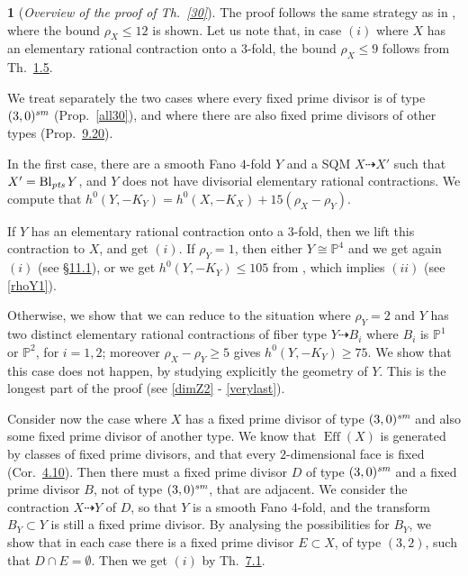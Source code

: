 \documentclass[10pt,a4paper]{amsart}
\theoremstyle{definition}
\newtheorem{prg}[thm]{}
\numberwithin{figure}{section}
\numberwithin{table}{section}
\newcommand{\pr}{\mathbb{P}}
\newcommand{\Eff}{\operatorname{Eff}}
\newcommand{\Bl}{\operatorname{Bl}}
\newcommand{\sm}{\text{\it sm}}
\newcommand{\pts}{\text{\it pts}}
\begin{document}
\begin{prg}[\em Overview of the proof of Th.~\ref{30}]\label{overview30}
The proof follows the same strategy as in \cite{blowup}, where the bound $\rho_X\leq 12$ is shown. Let us note that, in case $(i)$ where $X$ has an elementary rational contraction onto a $3$-fold, the bound $\rho_X\leq 9$ follows from Th.~\href{https://arxiv.org/abs/2508.21207v1}{1.5}.

We treat separately the two cases where every fixed prime divisor is of type $(3,0)^{\sm}$ (Prop.~\ref{all30}), and where there are also fixed prime divisors of other types (Prop.~\href{https://arxiv.org/abs/2508.21207v1}{9.20}).

In the first case, there are a smooth Fano $4$-fold $Y$ and a SQM $X\dasharrow X'$ such that $X'=\Bl_{\pts}Y$, and $Y$ does not have divisorial elementary rational contractions. We compute that $h^0(Y,-K_Y)=h^0(X,-K_X)+15(\rho_X-\rho_Y)$.  

If $Y$ has an elementary rational contraction onto a $3$-fold, then we lift this contraction to $X$, and get $(i)$.
If $\rho_Y=1$, then  either $Y\cong\pr^4$ and we get again $(i)$ (see \S\href{https://arxiv.org/abs/2508.21207v1}{11.1}), or we get $h^0(Y,-K_Y)\leq 105$ from \cite{blowup}, which implies
$(ii)$ (see \ref{rhoY1}).

Otherwise, we show that we can reduce to the situation where
 $\rho_Y=2$ and $Y$ has two distinct elementary rational contractions of fiber type $Y\dasharrow B_i$ where $B_i$ is $\pr^1$ or $\pr^2$, for $i=1,2$; moreover $\rho_X-\rho_Y\geq 5$ gives 
$h^0(Y,-K_Y)\geq 75$.
We show that this case does not happen, by studying explicitly the geometry of $Y$.
 This is the longest part of the proof (see \ref{dimZ2} - \ref{verylast}).

\medskip

Consider now the case where $X$ has a fixed prime divisor of type $(3,0)^{\sm}$ and also some fixed prime divisor of another type. We know that $\Eff(X)$ is generated by classes of fixed prime divisors, and that every $2$-dimensional face is fixed (Cor.~\href{https://arxiv.org/abs/2508.21207v1}{4.10}). Then there must a  fixed prime divisor $D$ of type $(3,0)^{\sm}$ and a fixed prime divisor $B$, not of type $(3,0)^{\sm}$, that are adjacent. We consider the contraction $X\dasharrow Y$ of $D$, so that $Y$ is a smooth Fano $4$-fold, and the transform $B_Y\subset Y$ is still a fixed prime divisor. By analysing 
 the possibilities for $B_Y$, we show that in each case there is a fixed prime divisor $E\subset X$, of type $(3,2)$, such that $D\cap E=\emptyset$. Then we get $(i)$ by Th.~\href{https://arxiv.org/abs/2508.21207v1}{7.1}.
\end{prg}
\end{document}
